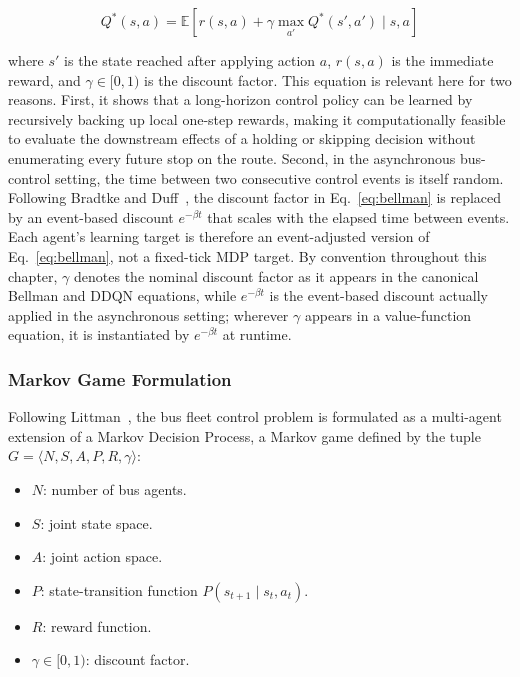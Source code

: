 \begin{equation}
Q^*(s, a) = \mathbb{E} \left[ r(s, a) + \gamma \max_{a'} Q^*(s', a') \mid s, a \right]
\label{eq:bellman}
\end{equation}

where $s'$ is the state reached after applying action $a$, $r(s,a)$ is the immediate reward, and $\gamma \in [0, 1)$ is the discount factor. This equation is relevant here for two reasons. First, it shows that a long-horizon control policy can be learned by recursively backing up local one-step rewards, making it computationally feasible to evaluate the downstream effects of a holding or skipping decision without enumerating every future stop on the route. Second, in the asynchronous bus-control setting, the time between two consecutive control events is itself random. Following Bradtke and Duff~\cite{Bradtke1995}, the discount factor in Eq.~\eqref{eq:bellman} is replaced by an event-based discount $e^{-\beta t}$ that scales with the elapsed time between events. Each agent's learning target is therefore an event-adjusted version of Eq.~\eqref{eq:bellman}, not a fixed-tick MDP target. By convention throughout this chapter, $\gamma$ denotes the nominal discount factor as it appears in the canonical Bellman and DDQN equations, while $e^{-\beta t}$ is the event-based discount actually applied in the asynchronous setting; wherever $\gamma$ appears in a value-function equation, it is instantiated by $e^{-\beta t}$ at runtime.


\subsubsection{Markov Game Formulation}

Following Littman~\cite{Littman1994}, the bus fleet control problem is formulated as a multi-agent extension of a Markov Decision Process, a Markov game defined by the tuple $G = \langle N, S, A, P, R, \gamma \rangle$:

\begin{itemize}
\item $N$: number of bus agents.
\item $S$: joint state space.
\item $A$: joint action space.
\item $P$: state-transition function $P(s_{t+1}\mid s_t, a_t)$.
\item $R$: reward function.
\item $\gamma \in [0, 1)$: discount factor.
\end{itemize}

